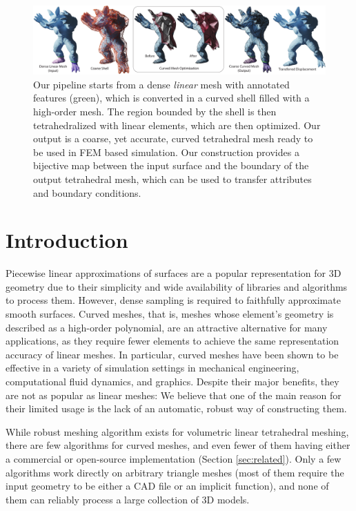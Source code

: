 
\begin{figure}
    \centering
    \includegraphics[width=\linewidth]{curve_meshing_in_shell_tex/figs/teaser}
    \caption{Our pipeline starts from a dense \emph{linear} mesh with annotated features (green), 
    which is converted in a curved shell filled with a high-order mesh. The region bounded by the shell is then tetrahedralized with linear elements, which are then optimized. Our output is a coarse, yet accurate, curved tetrahedral mesh ready to be used in FEM based simulation. Our construction provides a bijective map between the input surface and the boundary of the output tetrahedral mesh, which can be used to transfer attributes and boundary conditions.}
    \label{bichon:fig:teaser}
\end{figure}

\section{Introduction}

Piecewise linear approximations of surfaces are a popular representation for 3D geometry due to their simplicity and wide availability of libraries and algorithms to process them. However, dense sampling is required to faithfully approximate smooth surfaces. 
%
Curved meshes, that is, meshes whose element's geometry is described as a high-order polynomial, are an attractive alternative for many applications, as they require fewer elements to achieve the same representation accuracy of linear meshes. In particular, curved meshes have been shown to be effective in a variety of simulation settings in mechanical engineering, computational fluid dynamics, and graphics. Despite their major benefits, they are not as popular as linear meshes: We believe that {one of} the main reason for their limited usage is the lack of an automatic, robust way of constructing them. 

While robust meshing algorithm exists for volumetric linear tetrahedral meshing, there are few algorithms for curved meshes, and even fewer of them having either a commercial or open-source implementation (Section \ref{sec:related}). Only {a} few algorithms work directly on arbitrary triangle meshes (most of them require the input geometry to be either a CAD file or an implicit function), and none of them can reliably process a large collection of 3D models. 

